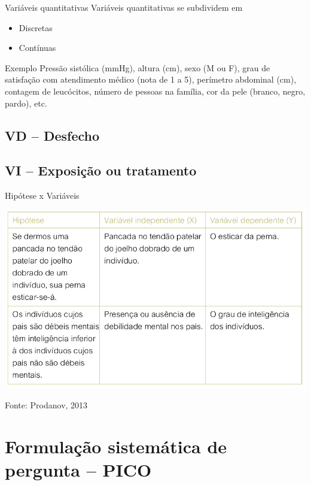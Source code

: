 \documentclass{beamer}
\begin{document}
\begin{frame}{Variáveis quantitativas}
Variáveis quantitativas se subdividem em
  \begin{itemize}
  \item<1-2> Discretas
  \item<3-4> Contínuas
  \end{itemize}
  \begin{exampleblock}{Exemplo}
    \alert{Pressão sistólica (mmHg)}, \alert{altura
      (cm)}, sexo (M ou F), grau de satisfação com atendimento médico
    (nota de 1 a 5), perímetro abdominal (cm), \alert{contagem
      de leucócitos}, \alert{número de pessoas na família},
    cor da pele (branco, negro, pardo), etc.
  \end{exampleblock}
\end{frame}

\subsection{VD -- Desfecho}

\subsection{VI -- Exposição ou tratamento}

\begin{frame}{Hipótese x Variáveis}
  \begin{center}
  \includegraphics[height=0.8\textheight]{Hipoteses_variaveis/hipotese_variaveis}
\end{center}

  \vfill
  \scriptsize
  \hfill Fonte: Prodanov, 2013
\end{frame}

\section{Formulação sistemática de pergunta -- PICO}
\end{document}
